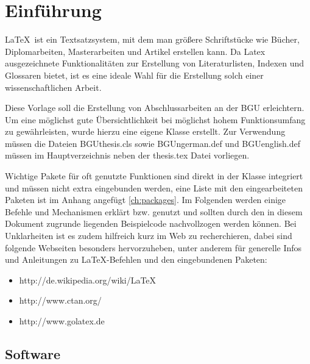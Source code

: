 \ifger

\chapter{Einführung}
\label{ch:einfuehrung}


\LaTeX\ ist ein Textsatzsystem, mit dem man größere Schriftstücke wie Bücher, Diplomarbeiten, Masterarbeiten und Artikel erstellen kann.
Da Latex ausgezeichnete Funktionalitäten zur Erstellung von Literaturlisten, Indexen und Glossaren bietet, ist es eine ideale Wahl für die Erstellung solch einer wissenschaftlichen Arbeit. \parencite{Stein:2014}

Diese Vorlage soll die Erstellung von Abschlussarbeiten an der \ac{BGU} erleichtern. 
Um eine möglichst gute Übersichtlichkeit bei möglichst hohem Funktionsumfang zu gewährleisten, wurde hierzu eine eigene Klasse erstellt. 
Zur Verwendung müssen die Dateien BGUthesis.cls sowie BGUngerman.def und BGUenglish.def müssen im Hauptverzeichnis neben der thesis.tex Datei vorliegen.

Wichtige Pakete für oft genutzte Funktionen sind direkt in der Klasse integriert und müssen nicht extra eingebunden werden, eine Liste mit den eingearbeiteten Paketen ist im Anhang angefügt \cref{ch:packages}. 
Im Folgenden werden einige Befehle und Mechanismen erklärt bzw. genutzt und sollten durch den in diesem Dokument zugrunde liegenden Beispielcode nachvollzogen werden können.
Bei Unklarheiten ist es zudem hilfreich kurz im Web zu recherchieren, dabei sind folgende Webseiten besonders hervorzuheben, unter anderem für generelle Infos und Anleitungen zu \LaTeX-Befehlen und den eingebundenen Paketen:

\begin{itemize}
	\item http://de.wikipedia.org/wiki/LaTeX
    \item http://www.ctan.org/
    \item http://www.golatex.de
\end{itemize}

\section{Software}
\label{sec:software}

